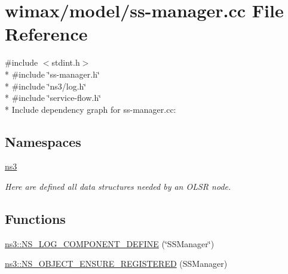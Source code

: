 \hypertarget{ss-manager_8cc}{}\section{wimax/model/ss-\/manager.cc File Reference}
\label{ss-manager_8cc}
{\ttfamily \#include $<$stdint.\+h$>$}\\*
{\ttfamily \#include \char`\"{}ss-\/manager.\+h\char`\"{}}\\*
{\ttfamily \#include \char`\"{}ns3/log.\+h\char`\"{}}\\*
{\ttfamily \#include \char`\"{}service-\/flow.\+h\char`\"{}}\\*
Include dependency graph for ss-\/manager.cc\+:
\subsection*{Namespaces}
\begin{DoxyCompactItemize}
\item 
 \hyperlink{namespacens3}{ns3}
\begin{DoxyCompactList}\small\item\em Here are defined all data structures needed by an O\+L\+SR node. \end{DoxyCompactList}\end{DoxyCompactItemize}
\subsection*{Functions}
\begin{DoxyCompactItemize}
\item 
\hyperlink{namespacens3_a0b43f6cea5412f59eb3db21f18127946}{ns3\+::\+N\+S\+\_\+\+L\+O\+G\+\_\+\+C\+O\+M\+P\+O\+N\+E\+N\+T\+\_\+\+D\+E\+F\+I\+NE} (\char`\"{}S\+S\+Manager\char`\"{})
\item 
\hyperlink{namespacens3_a53865b9bfa1e51bf80b776ed034568e4}{ns3\+::\+N\+S\+\_\+\+O\+B\+J\+E\+C\+T\+\_\+\+E\+N\+S\+U\+R\+E\+\_\+\+R\+E\+G\+I\+S\+T\+E\+R\+ED} (S\+S\+Manager)
\end{DoxyCompactItemize}
